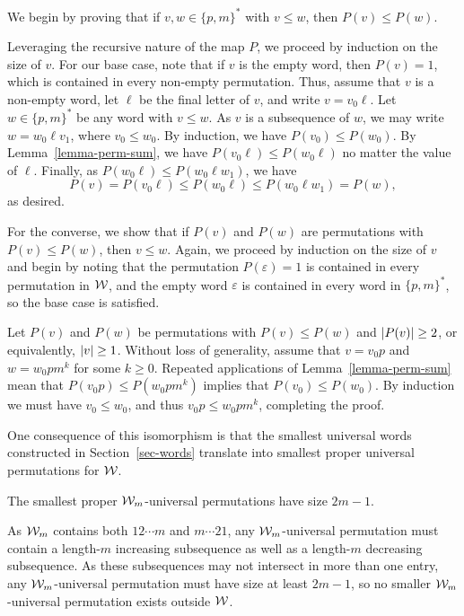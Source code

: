 \newenvironment{proof-of-prop-perm-wedge-isomorphism}{%
	\medskip\noindent {\it Proof of Proposition~\ref{prop-perm-wedge-isomorphism}.\/}%
}{%
	\qed\bigskip%
}
\begin{proof-of-prop-perm-wedge-isomorphism}
	We begin by proving that if $v, w \in \{p, m\}^\ast$ with $v \le w$, then $P(v) \le P(w)$.

	Leveraging the recursive nature of the map $P$, we proceed by induction on the size of $v$. For our base case, note that if $v$ is the empty word, then $P(v) = 1$, which is contained in every non-empty permutation. Thus, assume that $v$ is a non-empty word, let $\ell$ be the final letter of $v$, and write $v = v_0 \ell$. Let $w \in \{p, m\}^\ast$ be any word with $v \le w$. As $v$ is a subsequence of $w$, we may write $w = w_0 \ell v_1$, where $v_0 \le w_0$. By induction, we have $P(v_0) \le P(w_0)$. By Lemma~\ref{lemma-perm-sum}, we have $P(v_0\ell) \le P(w_0\ell)$ no matter the value of $\ell$. Finally, as $P(w_0\ell) \le P(w_0\ell w_1)$, we have
	\[
		P(v) 
		=
		P(v_0\ell)
		\le
		P(w_0\ell)
		\le
		P(w_0\ell w_1)
		=
		P(w),
	\]
	as desired.

	For the converse, we show that if $P(v)$ and $P(w)$ are permutations with $P(v) \le P(w)$, then $v \le w$. Again, we proceed by induction on the size of $v$ and begin by noting that the permutation $P(\varepsilon) = 1$ is contained in every permutation in $\mathcal{W}$, and the empty word $\varepsilon$ is contained in every word in $\{p, m\}^\ast$, so the base case is satisfied.

	Let $P(v)$ and $P(w)$ be permutations with $P(v) \le P(w)$ and $\left\lvert{P(v)}\right\rvert \ge 2$, or equivalently, $\left\lvert{v}\right\rvert \ge 1$. Without loss of generality, assume that $v = v_0 p$ and $w = w_0 p m^k$ for some $k \ge 0$. Repeated applications of Lemma~\ref{lemma-perm-sum} mean that $P(v_0 p) \le P(w_0 p m^k)$ implies that $P(v_0) \le P(w_0)$. By induction we must have $v_0 \le w_0$, and thus $v_0 p \le w_0 p m^k$, completing the proof.
\end{proof-of-prop-perm-wedge-isomorphism}

One consequence of this isomorphism is that the smallest universal words constructed in Section~\ref{sec-words} translate into smallest proper universal permutations for $\mathcal{W}$.
\begin{corollary}
\label{cor-perm-wedge-proper}
	The smallest proper $\mathcal{W}_m$-universal permutations have size $2m-1$.
\end{corollary}

As $\mathcal{W}_m$ contains both $12 \cdots m$ and $m \cdots 21$, any $\mathcal{W}_m$-universal permutation must contain a length-$m$ increasing subsequence as well as a length-$m$ decreasing subsequence. As these subsequences may not intersect in more than one entry, any $\mathcal{W}_m$-universal permutation must have size at least $2m-1$, so no smaller $\mathcal{W}_m$-universal permutation exists outside $\mathcal{W}$.

